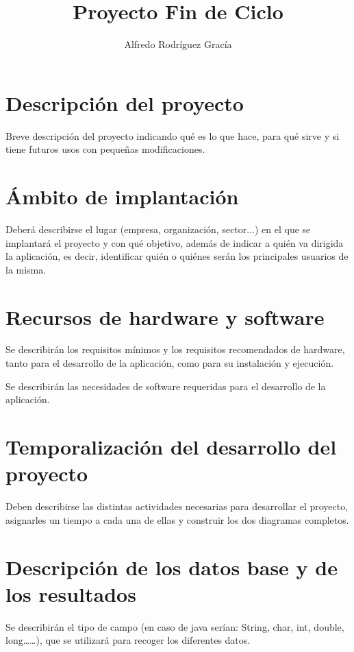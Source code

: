 \documentclass[12pt,a4paper,titlepage]{article}
\title{Proyecto Fin de Ciclo}
\author{Alfredo Rodríguez Gracía}
\begin{document}
    \maketitle

    \section{Descripción del proyecto}

    Breve descripción del proyecto indicando qué es lo que hace, para qué sirve y si tiene futuros usos con pequeñas modificaciones.

    \section{Ámbito de implantación}

    Deberá describirse el lugar (empresa, organización, sector...) en el que se implantará el proyecto y con qué objetivo, además de indicar a quién va dirigida la aplicación, es decir, identificar quién o quiénes serán los principales usuarios de la misma.

    \section{Recursos de hardware y software}

    Se describirán los requisitos mínimos y los requisitos recomendados de hardware, tanto para el desarrollo de la aplicación, como para su instalación y ejecución.

    Se describirán las necesidades de software requeridas para el desarrollo de la aplicación.

    \section{Temporalización del desarrollo del proyecto}

    Deben describirse las distintas actividades necesarias para desarrollar el proyecto, asignarles un tiempo a cada una de ellas y construir los dos diagramas completos.

    \section{Descripción de los datos base y de los resultados}

    Se describirán el tipo de campo (en caso de java serían: String, char, int, double, long……), que se utilizará para recoger los diferentes datos.
\end{document}
